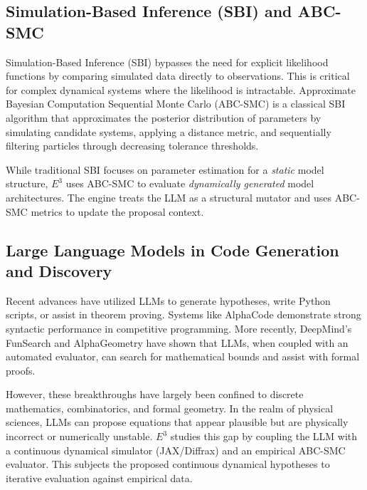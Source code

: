 \subsection{Simulation-Based Inference (SBI) and ABC-SMC}
Simulation-Based Inference (SBI) bypasses the need for explicit likelihood functions by comparing simulated data directly to observations. This is critical for complex dynamical systems where the likelihood is intractable. Approximate Bayesian Computation Sequential Monte Carlo (ABC-SMC) is a classical SBI algorithm that approximates the posterior distribution of parameters by simulating candidate systems, applying a distance metric, and sequentially filtering particles through decreasing tolerance thresholds.

While traditional SBI focuses on parameter estimation for a \textit{static} model structure, $E^3$ uses ABC-SMC to evaluate \textit{dynamically generated} model architectures. The engine treats the LLM as a structural mutator and uses ABC-SMC metrics to update the proposal context.

\subsection{Large Language Models in Code Generation and Discovery}
Recent advances have utilized LLMs to generate hypotheses, write Python scripts, or assist in theorem proving. Systems like AlphaCode demonstrate strong syntactic performance in competitive programming. More recently, DeepMind's FunSearch \citep{romera2023mathematical} and AlphaGeometry \citep{trinh2024solving} have shown that LLMs, when coupled with an automated evaluator, can search for mathematical bounds and assist with formal proofs.

However, these breakthroughs have largely been confined to discrete mathematics, combinatorics, and formal geometry. In the realm of physical sciences, LLMs can propose equations that appear plausible but are physically incorrect or numerically unstable. $E^3$ studies this gap by coupling the LLM with a continuous dynamical simulator (JAX/Diffrax) and an empirical ABC-SMC evaluator. This subjects the proposed continuous dynamical hypotheses to iterative evaluation against empirical data.
